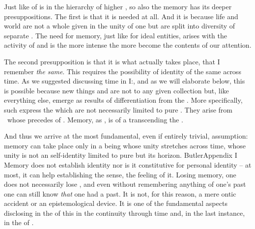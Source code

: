 \pa Just like  of  is  in the hierarchy
of higher , so also the  memory
has its deeper presuppositions.  The first is
that it is needed at all. And it is because life and world are not a whole given
in the unity of one  but are split into diversity of separate
. The need for memory, just like for ideal entities, arises
with the  activity of  and is the
more intense the more  become the contents of our
attention.

The second presupposition is that it is what actually takes place, that I 
remember {\em the same}.  This  requires the
possibility of  identity of the same across time. As we
suggested discussing time in I:, and as we will
elaborate below, this is possible because new things and  are
not  to any given collection but, like everything else, emerge as
results of differentiation from the . More specifically,
such  express the  which are not necessarily
limited to pure \hoa. They arise from  \nexuss\ whose 
precedes  of . Memory, as , is  of a  transcending the
\hoa.

And thus we arrive at the most fundamental, even if entirely trivial,
assumption: memory can take place only in a being whose unity stretches across
time, whose unity is not an  self-identity limited to pure
 but  its horizon.  \citet{All beings confessedly
  continue the same, during the whole time of their existence. [...]  All these
  successive actions, enjoyments, and sufferings, are actions, enjoyments and
  sufferings, of the same living being. And they are so, prior to all
  consideration of its remembering and forgetting [...]}{Butler}{Appendix I}
Memory does not establish identity nor is it constitutive for personal identity
-- at most, it can help establishing the sense, the feeling of it. Losing
memory, one does not necessarily lose , and even without remembering
anything of one's past one can still know {\em that} one had a past. 
%
It is not, for this reason, a mere ontic accident or an
epistemological device.  It is one of the fundamental aspects disclosing in  
 the  of this 
in the continuity through time and, in the last instance, in the  of
. 



